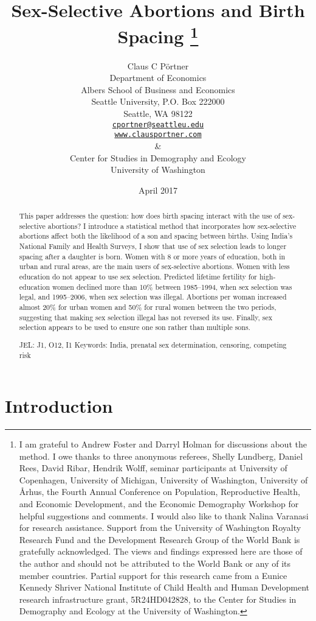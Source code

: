 \documentclass[12pt,letterpaper]{article}
\title{Sex-Selective Abortions and Birth Spacing
\protect\thanks{%
I am grateful to Andrew Foster and Darryl Holman for discussions about the method.
I owe thanks to three anonymous referees, Shelly Lundberg, Daniel Rees, David Ribar, 
Hendrik Wolff, seminar participants at University of Copenhagen, University of Michigan, 
University of Washington, University of \AA{}rhus, the Fourth 
Annual Conference on Population, Reproductive Health, 
and Economic Development, and the Economic Demography Workshop for helpful suggestions and comments.
I would also like to thank Nalina Varanasi for research assistance.
Support from the University of Washington Royalty Research Fund and the 
Development Research Group of the World Bank is gratefully acknowledged.
The views and findings expressed here are those of the author and
should not be attributed to the World Bank or any of its member countries.
Partial support for this research came from a Eunice Kennedy Shriver National
Institute of Child Health and Human Development research infrastructure grant,
5R24HD042828, to the Center for Studies in Demography and Ecology at the
University of Washington.
}
}
\author{}
\author{Claus C P\"ortner\\
    Department of Economics\\
    Albers School of Business and Economics\\
    Seattle University, P.O. Box 222000\\
    Seattle, WA 98122\\
    \href{mailto:cportner@seattleu.edu}{\texttt{cportner@seattleu.edu}}\\
    \href{http://www.clausportner.com}{\texttt{www.clausportner.com}}\\
    \& \\
    Center for Studies in Demography and Ecology \\
    University of Washington\\ \vspace{2cm}
    }
\date{April 2017}
\begin{document}
\graphicspath{{figures/}}

% 
% 
% 
% 
 
\maketitle
\thispagestyle{empty}


\newpage
\doublespacing


\begin{abstract}

\noindent This paper addresses the question:
how does birth spacing interact with the use of sex-selective abortions? 
I introduce a statistical method that incorporates how sex-selective abortions 
affect both the likelihood of a son and spacing between births.
Using India's National Family and Health Surveys,
I show that use of sex selection leads to longer spacing after a daughter is born.
Women with 8 or more years of education, both in urban and rural areas, are the main users 
of sex-selective abortions.
Women with less education do not appear to use sex selection.
Predicted lifetime fertility for high-education women declined more than 10\% 
between 1985--1994, when sex selection was legal, and 1995--2006, when sex selection was illegal.
Abortions per woman increased almost 20\% for urban women and 50\%
for rural women between the two periods, suggesting that making sex selection illegal has 
not reversed its use.
Finally, sex selection appears to be used to ensure one son rather than multiple sons.

\noindent JEL: J1, O12, I1
\noindent Keywords: India, prenatal sex determination, censoring, competing risk
\end{abstract}

\newpage



\section{Introduction\label{sec:intro}}
\end{document}
